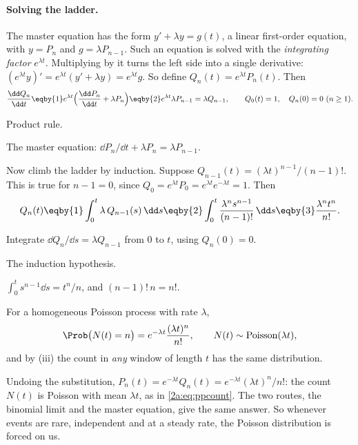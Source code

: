 \paragraph{Solving the ladder.} The master equation has the form $y'+\lambda y=g(t)$, a linear first-order equation, with $y=P_n$ and $g=\lambda P_{n-1}$. Such an equation is solved with the \emph{integrating factor} $e^{\lambda t}$. Multiplying by it turns the left side into a single derivative: $(e^{\lambda t}y)'=e^{\lambda t}(y'+\lambda y)=e^{\lambda t}g$. So define $Q_n(t)=e^{\lambda t}P_n(t)$. Then
\begin{align*}
  \frac{\dd Q_n}{\dd t} \eqby{1} e^{\lambda t}\Bigl(\frac{\dd P_n}{\dd t}+\lambda P_n\Bigr) \eqby{2} e^{\lambda t}\lambda P_{n-1} = \lambda Q_{n-1},
  \qquad Q_0(t)=1,\quad Q_n(0)=0\ (n\ge1).
\end{align*}
\begin{explain}
  \item Product rule.
  \item The master equation: $\dd P_n/\dd t+\lambda P_n=\lambda P_{n-1}$.
\end{explain}
Now climb the ladder by induction. Suppose $Q_{n-1}(t)=(\lambda t)^{n-1}/(n-1)!$. This is true for $n-1=0$, since $Q_0=e^{\lambda t}P_0=e^{\lambda t}e^{-\lambda t}=1$. Then
\begin{align*}
  Q_n(t) \eqby{1} \int_0^t\lambda\,Q_{n-1}(s)\,\dd s \eqby{2} \int_0^t\frac{\lambda^n s^{n-1}}{(n-1)!}\,\dd s \eqby{3} \frac{\lambda^nt^n}{n!}.
\end{align*}
\begin{explain}
  \item Integrate $\dd Q_n/\dd s=\lambda Q_{n-1}$ from $0$ to $t$, using $Q_n(0)=0$.
  \item The induction hypothesis.
  \item $\int_0^ts^{n-1}\dd s=t^n/n$, and $(n-1)!\,n=n!$.
\end{explain}
\begin{keyidea}
For a homogeneous Poisson process with rate $\lambda$,
\begin{equation}
  \Prob\bigl(N(t)=n\bigr)=e^{-\lambda t}\frac{(\lambda t)^n}{n!},\qquad N(t)\sim\mathrm{Poisson}(\lambda t), \label{2a:eq:ppcount}
\end{equation}
and by (iii) the count in \emph{any} window of length $t$ has the same distribution.
\end{keyidea}
Undoing the substitution, $P_n(t)=e^{-\lambda t}Q_n(t)=e^{-\lambda t}(\lambda t)^n/n!$: the count $N(t)$ is Poisson with mean $\lambda t$, as in \eqref{2a:eq:ppcount}. The two routes, the binomial limit and the master equation, give the same answer. So whenever events are rare, independent and at a steady rate, the Poisson distribution is forced on us.

